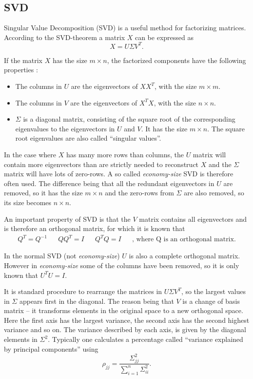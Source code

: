 \subsection{SVD}
Singular Value Decomposition (SVD) is a useful method for factorizing matrices.
 According to the SVD-theorem a matrix $X$  can be expressed as
\begin{equation}
X=U \Sigma V^{T}.
\label{eq:theory-svd}
\end{equation}

If the matrix $X$ has the size $m \times n$, the factorized components have the following properties \cite{introduction-to-data-mining}:
\begin{itemize}
\item The columns in $U$ are the eigenvectors of $X X^T$, with the size $m \times m$.
\item The columns in $V$ are the eigenvectors of $X^T X$, with the size $n \times n$.
\item $\Sigma$ is a diagonal matrix, consisting of the square root of the corresponding eigenvalues to the eigenvectors in $U$ and $V$.
It has the size $m \times n$. The square root eigenvalues are also called ``singular values''.
\end{itemize}

In the case where $X$ has many more rows than columns, the $U$ matrix will contain more eigenvectors than are strictly needed to reconstruct $X$ and the $\Sigma$ matrix will have lots of zero-rows.
A so called \textit{economy-size} SVD is therefore often used.
The difference being that all the redundant eigenvectors in $U$ are removed, so it has the size $m \times n$ and the zero-rows from $\Sigma$ are also removed, so its size becomes $n \times n$.

An important property of SVD is that the $V$ matrix contains all eigenvectors and is therefore an orthogonal matrix, for which it is known that
\begin{align}
Q^T = Q^{-1} && Q Q^T = I && Q^T Q = I && \text{, where Q is an orthogonal matrix.}
\end{align}

In the normal SVD (not \textit{economy-size}) $U$ is also a complete orthogonal matrix.
However in \textit{economy-size} some of the columns have been removed, so it is only known that $U^T U = I$.

It is standard procedure to rearrange the matrices in $U \Sigma V^T$, so the largest values in $\Sigma$ appears first in the diagonal.
The reason being that $V$ is a change of basis matrix -- it transforms elements in the original space to a new orthogonal space.
Here the first axis has the largest variance, the second axis has the second highest variance and so on.
The variance described by each axis, is given by the diagonal elements in $\Sigma^2$.
Typically one calculates a percentage called ``variance explained by principal components'' using
\begin{equation}
\rho_{jj} = \frac{\Sigma^2_{jj}}{\sum_{i=1}^n \Sigma^2_{ii}}.
\end{equation}

